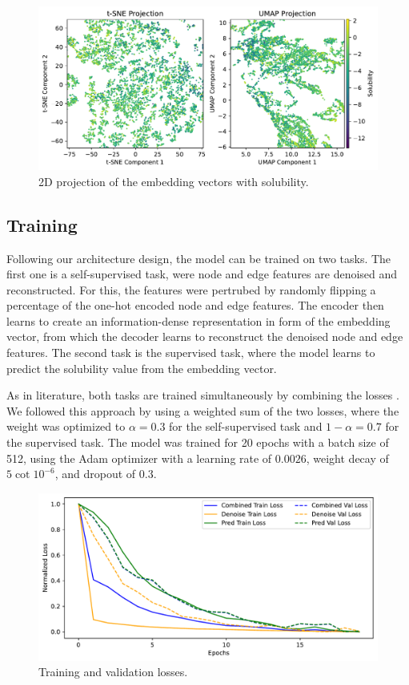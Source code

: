 \documentclass[11pt,a4paper]{article}
\begin{document}
\begin{figure}[htbp]
        \centering
        \includegraphics[width=1\textwidth]{solubility.pdf}
        \caption{2D projection of the embedding vectors with solubility.}
        \label{fig:solubility}
\end{figure}

\subsection{Training}

Following our architecture design, the model can be trained on two tasks. The first one is a self-supervised task, were node and edge features are denoised and reconstructed. For this, the features were pertrubed by randomly flipping a percentage of the one-hot encoded node and edge features. The encoder then learns to create an information-dense representation in form of the embedding vector, from which the decoder learns to reconstruct the denoised node and edge features. The second task is the supervised task, where the model learns to predict the solubility value from the embedding vector.

As in literature, both tasks are trained simultaneously by combining the losses \cite{cui2025online, wang2022test}. We followed this approach by using a weighted sum of the two losses, where the weight was optimized to $\alpha = 0.3$ for the self-supervised task and $ 1 - \alpha = 0.7$ for the supervised task. The model was trained for 20 epochs with a batch size of 512, using the Adam optimizer with a learning rate of $0.0026$, weight decay of $5 \cot 10^{-6}$, and dropout of $0.3$.

\begin{figure}[htbp]
        \centering
        \includegraphics[width=1\textwidth]{loss_plot.pdf}
        \caption{Training and validation losses.}
        \label{fig:loss_plot}
\end{figure}
\end{document}
